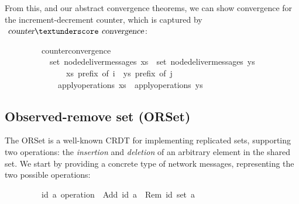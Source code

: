 \vspace{0.35em}
From this, and our abstract convergence theorems, we can show convergence for the increment-decrement counter, which is captured by $\isa{counter}{\isacharunderscore}\isa{convergence}$:
\vspace{0.35em}
\begin{isabellebody}
\ \ \ \ \ \ \ \ \ counter{\isacharunderscore}convergence{\isacharcolon}\isanewline
\ \ \ \ \ \ \ \ \ \ \ {\isachardoublequoteopen}set\ {\isacharparenleft}node{\isacharunderscore}deliver{\isacharunderscore}messages\ xs{\isacharparenright}\ {\isacharequal}\ set\ {\isacharparenleft}node{\isacharunderscore}deliver{\isacharunderscore}messages\ ys{\isacharparenright}{\isachardoublequoteclose}\isanewline
\ \ \ \ \ \ \ \ \ \ \ \ \ \ \ {\isachardoublequoteopen}xs\ prefix\ of\ i{\isachardoublequoteclose}\ \ {\isachardoublequoteopen}ys\ prefix\ of\ j{\isachardoublequoteclose}\isanewline
\ \ \ \ \ \ \ \ \ \ \ \ \ {\isachardoublequoteopen}apply{\isacharunderscore}operations\ xs\ {\isacharequal}\ apply{\isacharunderscore}operations\ ys{\isachardoublequoteclose}
\end{isabellebody}

\subsection{Observed-remove set (ORSet)}
\label{subsect.orset}

The ORSet is a well-known CRDT for implementing replicated sets, supporting two operations: the \emph{insertion} and \emph{deletion} of an arbitrary element in the shared set.
We start by providing a concrete type of network messages, representing the two possible operations:
\vspace{0.35em}
\begin{isabellebody}
\ \ \ \ \ \ \ \ \ {\isacharparenleft}{\isacharprime}id{\isacharcomma}\ {\isacharprime}a{\isacharparenright}\ operation\ {\isacharequal}\ Add\ {\isachardoublequoteopen}{\isacharprime}id{\isachardoublequoteclose}\ {\isachardoublequoteopen}{\isacharprime}a{\isachardoublequoteclose}\ {\isacharbar}\ Rem\ {\isachardoublequoteopen}{\isacharparenleft}{\isacharprime}id\ set{\isacharparenright}{\isachardoublequoteclose}\ {\isachardoublequoteopen}{\isacharprime}a{\isachardoublequoteclose}
\end{isabellebody}
\vspace{0.35em}

